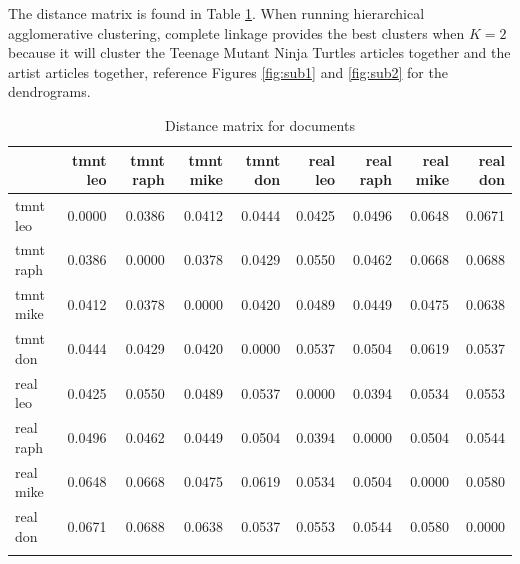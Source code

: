 \documentclass[12pt]{article}
\begin{document}
The distance matrix is found in Table \ref{distance_matrix}. When running hierarchical agglomerative clustering, complete linkage provides the best clusters when $K=2$ because it will cluster the Teenage Mutant Ninja Turtles articles together and the artist articles together, reference Figures \ref{fig:sub1} and \ref{fig:sub2} for the dendrograms.

\begin{table}[h!]
    \centering
    \caption{Distance matrix for documents}
    \vspace*{4mm}
    \label{distance_matrix}
    \begin{tabular}{lrrrrrrrr}
        \Xhline{3\arrayrulewidth}
        & tmnt leo & tmnt raph & tmnt mike & tmnt don & real leo & real raph & real mike & real don \\\hline
        tmnt leo & 0.0000 & 0.0386 & 0.0412 & 0.0444 & 0.0425 & 0.0496 & 0.0648 & 0.0671 \\
        tmnt raph & 0.0386 & 0.0000 & 0.0378 & 0.0429 & 0.0550 & 0.0462 & 0.0668 & 0.0688 \\
        tmnt mike & 0.0412 & 0.0378 & 0.0000 & 0.0420 & 0.0489 & 0.0449 & 0.0475 & 0.0638 \\
        tmnt don & 0.0444 & 0.0429 & 0.0420 & 0.0000 & 0.0537 & 0.0504 & 0.0619 & 0.0537 \\
        real leo & 0.0425 & 0.0550 & 0.0489 & 0.0537 & 0.0000 & 0.0394 & 0.0534 & 0.0553 \\
        real raph & 0.0496 & 0.0462 & 0.0449 & 0.0504 & 0.0394 & 0.0000 & 0.0504 & 0.0544 \\
        real mike & 0.0648 & 0.0668 & 0.0475 & 0.0619 & 0.0534 & 0.0504 & 0.0000 & 0.0580 \\
        real don & 0.0671 & 0.0688 & 0.0638 & 0.0537 & 0.0553 & 0.0544 & 0.0580 & 0.0000 \\
    \Xhline{3\arrayrulewidth}
    \end{tabular}
\end{table}
\end{document}
